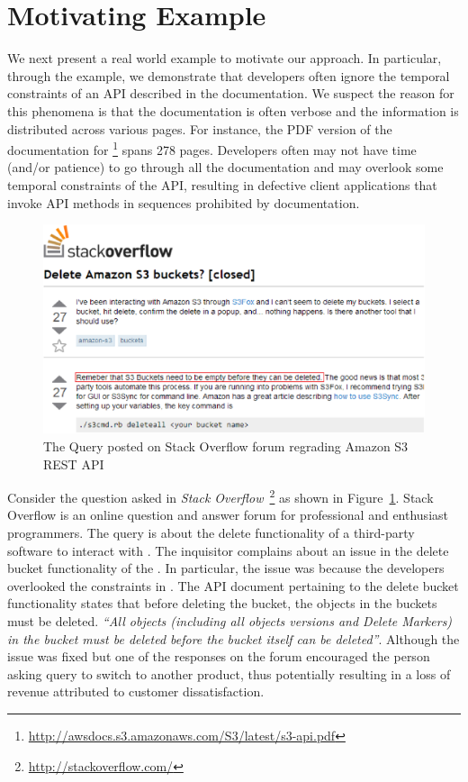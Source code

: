 \section{Motivating Example}
\label{sec:example}

We next present a real world example to motivate our approach.
In particular, through the example, we demonstrate that developers often ignore the temporal constraints of an API described in the documentation.
We suspect the reason for this phenomena is that the documentation is often verbose and the information is distributed across various pages.
For instance, the PDF version of the documentation for \amazonAPI\footnote{{\small \url{http://awsdocs.s3.amazonaws.com/S3/latest/s3-api.pdf}}} spans 278 pages.
Developers often may not have time (and/or patience) to go through all the documentation and may overlook some temporal constraints of the API,
resulting in defective client applications that invoke API methods in sequences prohibited by documentation. 

\begin{figure}[t]
	\begin{center}
		\includegraphics[scale=0.45]{Stackoverflow.eps}
	\end{center}
	\caption{\label{fig:Stackoverflow} The Query posted on Stack Overflow forum regrading Amazon S3 REST API}
\end{figure}

Consider the question asked in \textit{Stack Overflow}~\footnote{{\small \url{http://stackoverflow.com/}}} as shown in Figure~\ref{fig:Stackoverflow}.
Stack Overflow is an online question and answer forum for professional and enthusiast programmers.
The query is about the delete functionality of a third-party software  to interact with \amazonAPI.
The inquisitor complains about an issue in the delete bucket functionality of the .
In particular, the issue was because the  developers overlooked the constraints in \amazon.
The API document pertaining to the  delete bucket functionality states that before deleting the bucket, the objects in the buckets must be deleted.
\textit{``All objects (including all objects versions and Delete Markers) in the bucket must be deleted before the bucket itself can be deleted''}.
Although the issue was fixed but one of the responses on the forum encouraged the person asking query to switch to another product,
thus potentially resulting in a loss of revenue attributed to customer dissatisfaction.
 
